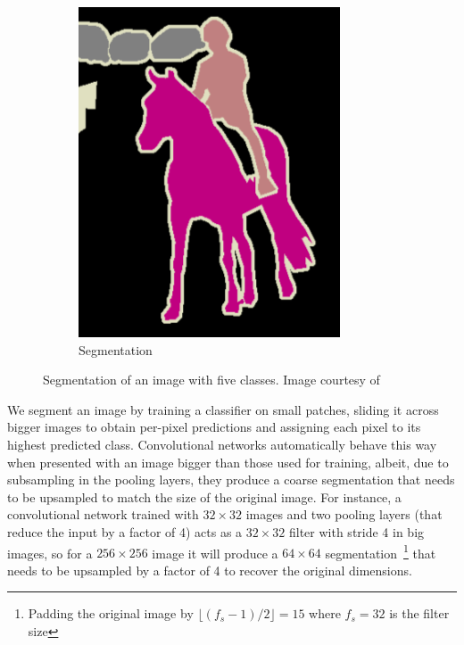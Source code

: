 \begin{figure}[h]
\begin{subfigure}{0.27\textwidth}
                \includegraphics[width=\textwidth]{plots/segmentationTruth.png}
		\caption{Segmentation}
        \end{subfigure}
	\caption[Segmentation of an image]{Segmentation of an image with five classes. Image courtesy of~\cite{Long2015}}
	\label{fig:imageSegmentation}
\end{figure}
We segment an image by training a classifier on small patches, sliding it across bigger images to obtain per-pixel predictions and assigning each pixel to its highest predicted class.
Convolutional networks automatically behave this way when presented with an image bigger than those used for training, albeit, due to subsampling in the pooling layers, they produce a coarse segmentation that needs to be upsampled to match the size of the original image.
For instance, a convolutional network trained with $32\times 32$ images and two pooling layers (that reduce the input by a factor of 4) acts as a $32 \times 32$ filter with stride 4 in big images, so for a $256 \times 256$ image it will produce a $64 \times 64$ segmentation~\footnote{Padding the original image by $\lfloor (f_s-1)/2\rfloor = 15$ where $f_s = 32$ is the filter size} that needs to be upsampled by a factor of 4 to recover the original dimensions. 
